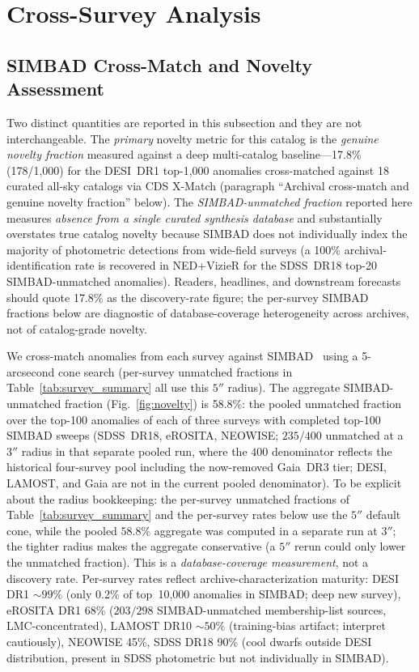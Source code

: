 \documentclass[aps,prd,twocolumn,superscriptaddress,showpacs,preprintnumbers,nofootinbib,longbibliography,floatfix]{revtex4-2}
\begin{document}
\section{Cross-Survey Analysis}\label{sec:crosssurvey}

\subsection{SIMBAD Cross-Match and Novelty Assessment}\label{sec:simbad}

Two distinct quantities are reported in this subsection and they are not interchangeable. The \emph{primary} novelty metric for this catalog is the \emph{genuine novelty fraction} measured against a deep multi-catalog baseline---17.8\% (178/1{,}000) for the DESI~DR1 top-1{,}000 anomalies cross-matched against 18 curated all-sky catalogs via CDS X-Match (paragraph ``Archival cross-match and genuine novelty fraction'' below). The \emph{SIMBAD-unmatched fraction} reported here measures \emph{absence from a single curated synthesis database} and substantially overstates true catalog novelty because SIMBAD does not individually index the majority of photometric detections from wide-field surveys (a 100\% archival-identification rate is recovered in NED+VizieR for the SDSS~DR18 top-20 SIMBAD-unmatched anomalies). Readers, headlines, and downstream forecasts should quote 17.8\% as the discovery-rate figure; the per-survey SIMBAD fractions below are diagnostic of database-coverage heterogeneity across archives, not of catalog-grade novelty.

We cross-match anomalies from each survey against SIMBAD~\cite{Wenger2000} using a 5-arcsecond cone search (per-survey unmatched fractions in Table~\ref{tab:survey_summary} all use this $5''$ radius). The aggregate SIMBAD-unmatched fraction (Fig.~\ref{fig:novelty}) is 58.8\%: the pooled unmatched fraction over the top-100 anomalies of each of three surveys with completed top-100 SIMBAD sweeps (SDSS~DR18, eROSITA, NEOWISE; $235/400$ unmatched at a $3''$ radius in that separate pooled run, where the $400$ denominator reflects the historical four-survey pool including the now-removed Gaia~DR3 tier; DESI, LAMOST, and Gaia are not in the current pooled denominator). To be explicit about the radius bookkeeping: the per-survey unmatched fractions of Table~\ref{tab:survey_summary} and the per-survey rates below use the $5''$ default cone, while the pooled $58.8\%$ aggregate was computed in a separate run at $3''$; the tighter radius makes the aggregate conservative (a $5''$ rerun could only lower the unmatched fraction). This is a \emph{database-coverage measurement}, not a discovery rate. Per-survey rates reflect archive-characterization maturity: DESI DR1 $\sim\!99\%$ (only 0.2\% of top~10{,}000 anomalies in SIMBAD; deep new survey), eROSITA DR1 68\% ($203/298$ SIMBAD-unmatched membership-list sources, LMC-concentrated), LAMOST DR10 $\sim\!50\%$ (training-bias artifact; interpret cautiously), NEOWISE 45\%, SDSS DR18 90\% (cool dwarfs outside DESI distribution, present in SDSS photometric but not individually in SIMBAD).
\end{document}
